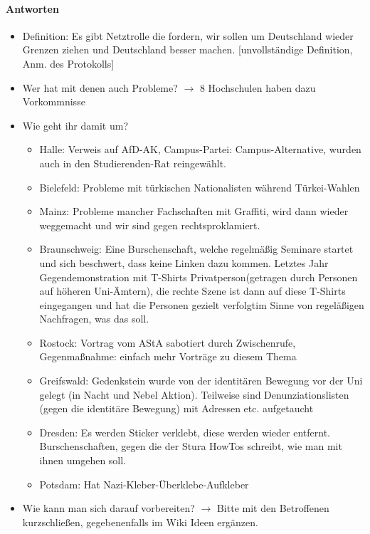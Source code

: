       \paragraph{Antworten}
        \begin{itemize}
          \item Definition: Es gibt Netztrolle die fordern, wir sollen um Deutschland wieder Grenzen ziehen und Deutschland besser machen. [unvollständige Definition, Anm. des Protokolls]
          \item Wer hat mit denen auch Probleme? $\rightarrow$ 8 Hochschulen haben dazu Vorkommnisse
          \item Wie geht ihr damit um?
            \begin{itemize}
              \item Halle: Verweis auf AfD-AK, Campus-Partei: Campus-Alternative, wurden auch in den Studierenden-Rat reingewählt.
              \item Bielefeld: Probleme mit türkischen Nationalisten während Türkei-Wahlen
              \item Mainz: Probleme mancher Fachschaften mit Graffiti, wird dann wieder weggemacht und \flqq wir sind gegen rechts\frqq proklamiert.
              \item Braunschweig: Eine Burschenschaft, welche regelmäßig Seminare startet und sich beschwert, dass keine Linken dazu kommen. Letztes Jahr Gegendemonstration mit T-Shirts \flqq Privatperson\frqq (getragen durch Personen auf höheren Uni-Ämtern), die rechte Szene ist dann auf diese T-Shirts eingegangen und hat die Personen gezielt \flqq verfolgt\frqq im Sinne von regeläßigen Nachfragen, was das soll.
              \item Rostock: Vortrag vom AStA sabotiert durch Zwischenrufe, Gegenmaßnahme: einfach mehr Vorträge zu diesem Thema
              \item Greifswald: Gedenkstein wurde von der identitären Bewegung vor der Uni gelegt (in Nacht und Nebel Aktion). Teilweise sind Denunziationslisten (gegen die identitäre Bewegung) mit Adressen etc. aufgetaucht
              \item Dresden: Es werden Sticker verklebt, diese werden wieder entfernt. Burschenschaften, gegen die der Stura HowTos schreibt, wie man mit ihnen umgehen soll.
              \item Potsdam: Hat Nazi-Kleber-Überklebe-Aufkleber
            \end{itemize}
          \item Wie kann man sich darauf vorbereiten? $\rightarrow$ Bitte mit den Betroffenen kurzschließen, gegebenenfalls im Wiki Ideen ergänzen.
        \end{itemize}

